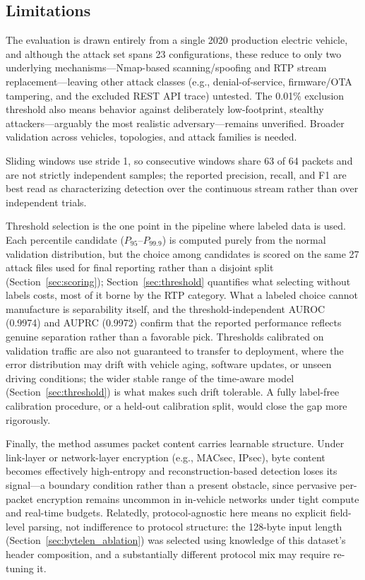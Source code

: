 \subsection{Limitations}
\label{sec:limitations}
The evaluation is drawn entirely from a single 2020 production electric vehicle, and although the attack set spans 23 configurations, these reduce to only two underlying mechanisms---Nmap-based scanning/spoofing and RTP stream replacement---leaving other attack classes (e.g., denial-of-service, firmware/OTA tampering, and the excluded REST API trace) untested. The 0.01\% exclusion threshold also means behavior against deliberately low-footprint, stealthy attackers---arguably the most realistic adversary---remains unverified. Broader validation across vehicles, topologies, and attack families is needed.

Sliding windows use stride 1, so consecutive windows share 63 of 64 packets and are not strictly independent samples; the reported precision, recall, and F1 are best read as characterizing detection over the continuous stream rather than over independent trials.

Threshold selection is the one point in the pipeline where labeled data is used. Each percentile candidate ($P_{95}$--$P_{99.9}$) is computed purely from the normal validation distribution, but the choice among candidates is scored on the same 27 attack files used for final reporting rather than a disjoint split (Section~\ref{sec:scoring}); Section~\ref{sec:threshold} quantifies what selecting without labels costs, most of it borne by the RTP category. What a labeled choice cannot manufacture is separability itself, and the threshold-independent AUROC (0.9974) and AUPRC (0.9972) confirm that the reported performance reflects genuine separation rather than a favorable pick. Thresholds calibrated on validation traffic are also not guaranteed to transfer to deployment, where the error distribution may drift with vehicle aging, software updates, or unseen driving conditions; the wider stable range of the time-aware model (Section~\ref{sec:threshold}) is what makes such drift tolerable. A fully label-free calibration procedure, or a held-out calibration split, would close the gap more rigorously.

Finally, the method assumes packet content carries learnable structure. Under link-layer or network-layer encryption (e.g., MACsec, IPsec), byte content becomes effectively high-entropy and reconstruction-based detection loses its signal---a boundary condition rather than a present obstacle, since pervasive per-packet encryption remains uncommon in in-vehicle networks under tight compute and real-time budgets. Relatedly, protocol-agnostic here means no explicit field-level parsing, not indifference to protocol structure: the 128-byte input length (Section~\ref{sec:bytelen_ablation}) was selected using knowledge of this dataset's header composition, and a substantially different protocol mix may require re-tuning it.

